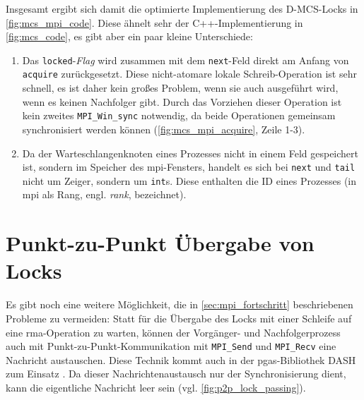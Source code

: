 Insgesamt ergibt sich damit die optimierte Implementierung des D-MCS-Locks
in \autoref{fig:mcs_mpi_code}.
Diese ähnelt sehr der C++-Implementierung in \autoref{fig:mcs_code},
es gibt aber ein paar kleine Unterschiede:
\begin{enumerate}
    \item Das \texttt{locked}-\textit{Flag} wird zusammen mit dem \texttt{next}-Feld direkt am Anfang von \texttt{acquire} zurückgesetzt.
          Diese nicht-atomare lokale Schreib-Operation ist sehr schnell,
          es ist daher kein großes Problem,
          wenn sie auch ausgeführt wird,
          wenn es keinen Nachfolger gibt.
          Durch das Vorziehen dieser Operation ist kein zweites \texttt{MPI\_Win\_sync} notwendig,
          da beide Operationen gemeinsam synchronisiert werden können
          (\autoref{fig:mcs_mpi_acquire}, Zeile 1-3).
    \item Da der Warteschlangenknoten eines Prozesses nicht in einem Feld gespeichert ist,
          sondern im Speicher des \gls{mpi}-\gls{Fenster}s,
          handelt es sich bei \texttt{next} und \texttt{tail} nicht um Zeiger,
          sondern um \texttt{int}s.
          Diese enthalten die ID eines Prozesses
          (in \gls{mpi} als Rang, engl. \textit{rank}, bezeichnet).
\end{enumerate}

\section{Punkt-zu-Punkt Übergabe von Locks}
\label{sec:p2p_lock_passing}

Es gibt noch eine weitere Möglichkeit,
die in \autoref{sec:mpi_fortschritt} beschriebenen Probleme zu vermeiden:
Statt für die Übergabe des Locks mit einer Schleife auf eine \gls{rma}-Operation zu warten,
können der Vorgänger- und Nachfolgerprozess auch mit Punkt-zu-Punkt-Kommunikation mit \texttt{MPI\_Send} und \texttt{MPI\_Recv} eine Nachricht austauschen.
Diese Technik kommt auch in der \gls{pgas}-Bibliothek DASH zum Einsatz \cite{DART-MPI}.
Da dieser Nachrichtenaustausch nur der Synchronisierung dient,
kann die eigentliche Nachricht leer sein
(vgl. \autoref{fig:p2p_lock_passing}).

